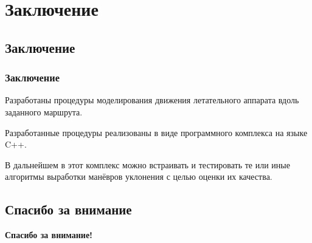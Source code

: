 \documentclass[10pt,t]{beamer}
\begin{document}
\section[Заключение]{Заключение}
\subsection[Заключение]{Заключение}
\begin{frame}
\frametitle{Заключение}
\small

Разработаны процедуры моделирования движения летательного аппарата вдоль заданного маршрута.

Разработанные процедуры реализованы в виде программного комплекса на языке C++.

В дальнейшем в этот комплекс можно встраивать и тестировать те или иные алгоритмы выработки манёвров уклонения с целью оценки их качества. 

\end{frame}

\subsection[Спасибо за внимание]{Спасибо за внимание}
\begin{frame}
\vfill
\centering

\textbf{\Large
Спасибо за внимание!}

\vfill
\end{frame}
\end{document}
